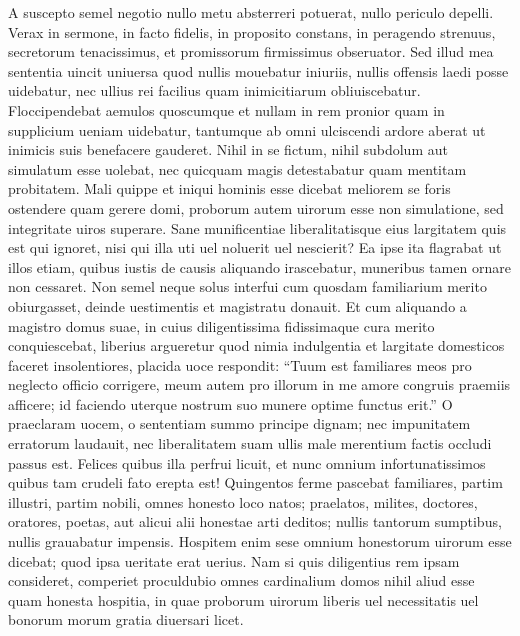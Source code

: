 \documentclass[a5paper,twoside]{article}
\begin{document}
A suscepto semel negotio nullo metu absterreri potuerat, nullo periculo depelli. Verax in sermone, in facto fidelis, in proposito constans, in peragendo strenuus, secretorum tenacissimus, et promissorum firmissimus obseruator. Sed illud mea sententia uincit uniuersa quod nullis mouebatur iniuriis, nullis offensis laedi posse uidebatur, nec ullius rei facilius quam inimicitiarum obliuiscebatur. Floccipendebat aemulos quoscumque et nullam in rem pronior quam in supplicium ueniam uidebatur, tantumque ab omni ulciscendi ardore aberat ut inimicis suis benefacere gauderet. Nihil in se fictum, nihil subdolum aut simulatum esse uolebat, nec quicquam magis detestabatur quam mentitam probitatem. Mali quippe et iniqui hominis esse dicebat meliorem se foris ostendere quam gerere domi, proborum autem uirorum esse non simulatione, sed integritate uiros superare. Sane munificentiae liberalitatisque eius largitatem quis est qui ignoret, nisi qui illa uti uel noluerit uel nescierit? Ea ipse ita flagrabat ut illos etiam, quibus iustis de causis aliquando irascebatur, muneribus tamen ornare non cessaret. Non semel neque solus interfui cum quosdam familiarium merito obiurgasset, deinde uestimentis et magistratu donauit. Et cum aliquando a magistro domus suae, in cuius diligentissima fidissimaque cura merito conquiescebat, liberius argueretur quod nimia indulgentia et largitate domesticos faceret insolentiores, placida uoce respondit: ``Tuum est familiares meos pro neglecto officio corrigere, meum autem pro illorum in me amore congruis praemiis afficere; id faciendo uterque nostrum suo munere optime functus erit.'' O praeclaram uocem, o sententiam summo principe dignam; nec impunitatem erratorum laudauit, nec liberalitatem suam ullis male merentium factis occludi passus est. Felices quibus illa perfrui licuit, et nunc omnium infortunatissimos quibus tam crudeli fato erepta est! Quingentos ferme pascebat familiares, partim illustri, partim nobili, omnes honesto loco natos; praelatos, milites, doctores, oratores, poetas, aut alicui alii honestae arti deditos; nullis tantorum sumptibus, nullis grauabatur impensis. Hospitem enim sese omnium honestorum uirorum esse dicebat; quod ipsa ueritate erat uerius. Nam si quis diligentius rem ipsam consideret, comperiet proculdubio omnes cardinalium domos nihil aliud esse quam honesta hospitia, in quae proborum uirorum liberis uel necessitatis uel bonorum morum gratia diuersari licet.


\endnumbering
\end{document}
